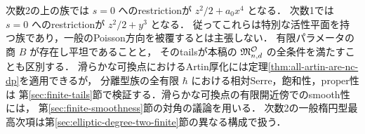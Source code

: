 次数2の上の族では $s=0$ へのrestrictionが $z^2/2+a_0x^4$ となる．
次数1では $s=0$ へのrestrictionが $z^2/2+y^3$ となる．
従ってこれらは特別な活性平面を持つ族であり，一般のPoisson方向を被覆するとは主張しない．
有限パラメータの商 $B$ が存在し平坦であることと，
そのtailsが本稿の $\mathfrak M^{\mathcal O}_{n,d}$ の全条件を満たすことも区別する．
滑らかな可換点におけるArtin厚化には定理\ref{thm:all-artin-are-nc-dp}を適用できるが，
分離型族の全有限 $\hbar$ における相対Serre，飽和性，proper性は
第\ref{sec:finite-tails}節で検証する．滑らかな可換点の有限開近傍でのsmooth性には，
第\ref{sec:finite-smoothness}節の対角の議論を用いる．
次数2の一般楕円型最高次項は第\ref{sec:elliptic-degree-two-finite}節の異なる構成で扱う．

